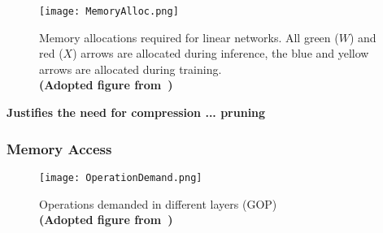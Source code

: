 \documentclass[../../D1.tex]{subfiles}
\begin{document}
\begin{figure}[H]
    \texttt{[image: MemoryAlloc.png]} 
    \caption{Memory allocations required for linear networks. All green ($W$) and red ($X$) arrows are allocated during inference, the blue and yellow arrows are allocated during training.\\ \textbf{(Adopted figure from~\autocite{rhuVDNNVirtualizedDeep2016})}}
    \label{fig:memAllocInf}   
\end{figure}


\textbf{Justifies the need for compression ... pruning}


\subsubsection{Memory Access}

\begin{figure}[H]
    \begin{center}
        \texttt{[image: OperationDemand.png]} 
    \end{center}
    
    \caption{Operations demanded in different layers (GOP)\\ \textbf{(Adopted figure from~\autocite{qiuGoingDeeperEmbedded2016})}}
    \label{fig:CNNcomplexity}   
\end{figure}
\end{document}
